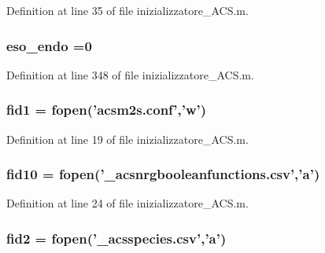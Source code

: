Definition at line 35 of file inizializzatore\-\_\-\-A\-C\-S.\-m.

\hypertarget{a00110_aad3b1a68f41f4a6fa247c1cf8e1d450a}{
\subsubsection[{eso\-\_\-endo}]{ eso\-\_\-endo =0}}\label{a00110_aad3b1a68f41f4a6fa247c1cf8e1d450a}


Definition at line 348 of file inizializzatore\-\_\-\-A\-C\-S.\-m.

\hypertarget{a00110_aff1e821fc5f97a0758f74b5cbd00cacf}{
\subsubsection[{fid1}]{\setlength{\rightskip}{0pt plus 5cm}fid1 = fopen('acsm2s.\-conf','w')}}\label{a00110_aff1e821fc5f97a0758f74b5cbd00cacf}


Definition at line 19 of file inizializzatore\-\_\-\-A\-C\-S.\-m.

\hypertarget{a00110_aadad4fd2d661ea2b9f0c3a95e3f7b4ba}{
\subsubsection[{fid10}]{\setlength{\rightskip}{0pt plus 5cm}fid10 = fopen('\-\_\-acsnrgbooleanfunctions.\-csv','{\bf a}')}}\label{a00110_aadad4fd2d661ea2b9f0c3a95e3f7b4ba}


Definition at line 24 of file inizializzatore\-\_\-\-A\-C\-S.\-m.

\hypertarget{a00110_a11af2c31c7926441f43875d99b4577d2}{
\subsubsection[{fid2}]{\setlength{\rightskip}{0pt plus 5cm}fid2 = fopen('\-\_\-acsspecies.\-csv','{\bf a}')}}\label{a00110_a11af2c31c7926441f43875d99b4577d2}


